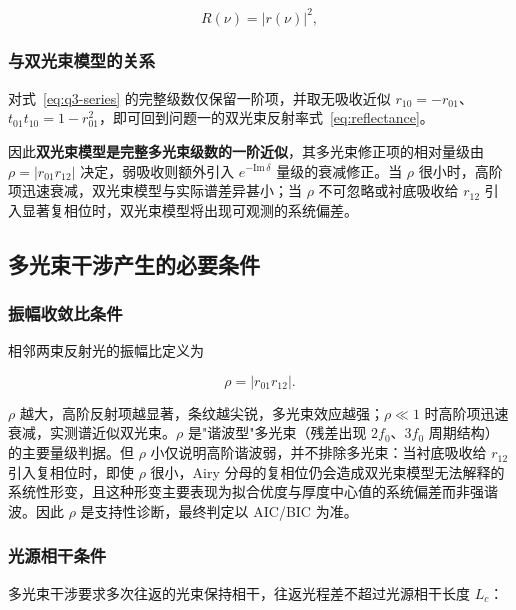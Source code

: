 \documentclass[withoutpreface,bwprint]{cumcmthesis}
\begin{document}
\begin{equation}
R(\nu) = \left|r(\nu)\right|^{2},
\label{eq:q3-reflectance}
\end{equation}

\subsubsection{与双光束模型的关系}

对式~\eqref{eq:q3-series} 的完整级数仅保留一阶项，并取无吸收近似 $r_{10}=-r_{01}$、$t_{01}t_{10}=1-r_{01}^{2}$，即可回到问题一的双光束反射率式~\eqref{eq:reflectance}。

因此\textbf{双光束模型是完整多光束级数的一阶近似}，其多光束修正项的相对量级由 $\rho=\lvert r_{01}r_{12}\rvert$ 决定，弱吸收则额外引入 $e^{-\mathrm{Im}\,\delta}$ 量级的衰减修正。当 $\rho$ 很小时，高阶项迅速衰减，双光束模型与实际谱差异甚小；当 $\rho$ 不可忽略或衬底吸收给 $r_{12}$ 引入显著复相位时，双光束模型将出现可观测的系统偏差。

\subsection{多光束干涉产生的必要条件}

\subsubsection{振幅收敛比条件}

相邻两束反射光的振幅比定义为

\begin{equation}
\rho = \left|r_{01}r_{12}\right|.
\label{eq:rho}
\end{equation}

$\rho$ 越大，高阶反射项越显著，条纹越尖锐，多光束效应越强；$\rho\ll 1$ 时高阶项迅速衰减，实测谱近似双光束。$\rho$ 是"谐波型"多光束（残差出现 $2f_0$、$3f_0$ 周期结构）的主要量级判据。但 $\rho$ 小仅说明高阶谐波弱，并不排除多光束：当衬底吸收给 $r_{12}$ 引入复相位时，即使 $\rho$ 很小，Airy 分母的复相位仍会造成双光束模型无法解释的系统性形变，且这种形变主要表现为拟合优度与厚度中心值的系统偏差而非强谐波。因此 $\rho$ 是支持性诊断，最终判定以 AIC/BIC 为准。

\subsubsection{光源相干条件}

多光束干涉要求多次往返的光束保持相干，往返光程差不超过光源相干长度 $L_c$：
\end{document}
